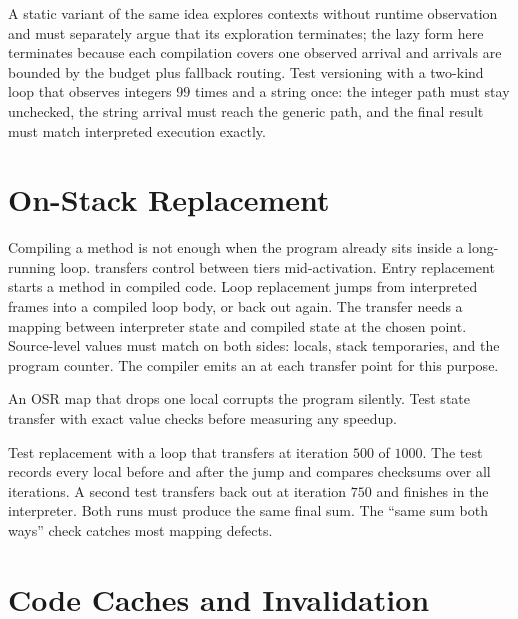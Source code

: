 A static variant of the same idea explores contexts without runtime observation and must separately argue that its exploration terminates; the lazy form here terminates because each compilation covers one observed arrival and arrivals are bounded by the budget plus fallback routing.
Test versioning with a two-kind loop that observes integers $99$ times and a string once: the integer path must stay unchecked, the string arrival must reach the generic path, and the final result must match interpreted execution exactly.

\section{On-Stack Replacement}\label{sec:ch34-osr}

Compiling a method is not enough when the program already sits inside a long-running loop.
 transfers control between tiers mid-activation.
Entry replacement starts a method in compiled code.
Loop replacement jumps from interpreted frames into a compiled loop body, or back out again.
The transfer needs a mapping between interpreter state and compiled state at the chosen point.
Source-level values must match on both sides: locals, stack temporaries, and the program counter.
The compiler emits an  at each transfer point for this purpose.
\begin{ccnote}
An OSR map that drops one local corrupts the program silently.
Test state transfer with exact value checks before measuring any speedup.
\end{ccnote}
Test replacement with a loop that transfers at iteration $500$ of $1000$.
The test records every local before and after the jump and compares checksums over all iterations.
A second test transfers back out at iteration $750$ and finishes in the interpreter.
Both runs must produce the same final sum.
The \enquote{same sum both ways} check catches most mapping defects.

\section{Code Caches and Invalidation}\label{sec:ch34-caches}

